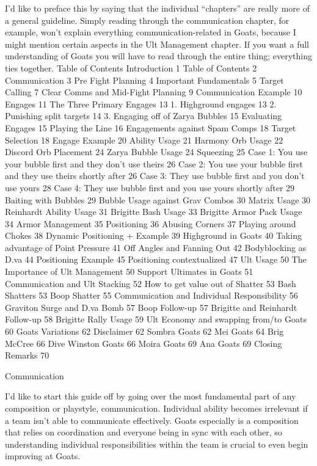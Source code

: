 I’d like to preface this by saying that the individual “chapters” are really more of a general guideline. Simply reading through the communication chapter, for example, won’t explain everything communication-related in Goats, because I might mention certain aspects in the Ult Management chapter. If you want a full understanding of Goats you will have to read through the entire thing; everything ties together.
Table of Contents
Introduction	1
Table of Contents	2
Communication	3
Pre Fight Planning	4
Important Fundamentals	5
Target Calling	7
Clear Comms and Mid-Fight Planning	9
Communication Example	10
Engages	11
The Three Primary Engages	13
1. Highground engages	13
2. Punishing split targets	14
3. Engaging off of Zarya Bubbles	15
Evaluating Engages	15
Playing the Line	16
Engagements against Spam Comps	18
Target Selection	18
Engage Example	20
Ability Usage	21
Harmony Orb Usage	22
Discord Orb Placement	24
Zarya Bubble Usage	24
Squeezing	25
Case 1: You use your bubble first and they don’t use theirs	26
Case 2: You use your bubble first and they use theirs shortly after	26
Case 3: They use bubble first and you don’t use yours	28
Case 4: They use bubble first and you use yours shortly after	29
Baiting with Bubbles	29
Bubble Usage against Grav Combos	30
Matrix Usage	30
Reinhardt Ability Usage	31
Brigitte Bash Usage	33
Brigitte Armor Pack Usage	34
Armor Management	35
Positioning	36
Abusing Corners	37
Playing around Chokes	38
Dynamic Positioning + Example	39
Highground in Goats	40
Taking advantage of Point Pressure	41
Off Angles and Fanning Out	42
Bodyblocking as D.va	44
Positioning Example	45
Positioning contextualized	47
Ult Usage	50
The Importance of Ult Management	50
Support Ultimates in Goats	51
Communication and Ult Stacking	52
How to get value out of Shatter	53
Bash Shatters	53
Boop Shatter	55
Communication and Individual Responsibility	56
Graviton Surge and D.va Bomb	57
Boop Follow-up	57
Brigitte and Reinhardt Follow-up	58
Brigitte Rally Usage	59
Ult Economy and swapping from/to Goats	60
Goats Variations	62
Disclaimer	62
Sombra Goats	62
Mei Goats	64
Brig McCree	66
Dive Winston Goats	66
Moira Goats	69
Ana Goats	69
Closing Remarks	70



Communication

I’d like to start this guide off by going over the most fundamental part of any composition or playstyle, communication. Individual ability becomes irrelevant if a team isn’t able to communicate effectively. Goats especially is a composition that relies on coordination and everyone being in sync with each other, so understanding individual responsibilities within the team is crucial to even begin improving at Goats.


